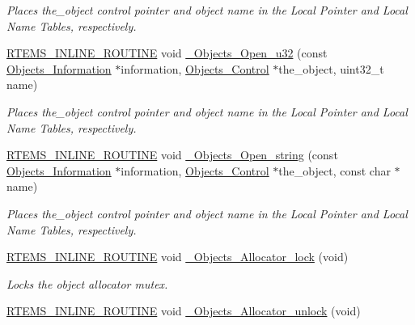 \begin{DoxyCompactItemize}
\begin{DoxyCompactList}\small\item\em Places the\+\_\+object control pointer and object name in the Local Pointer and Local Name Tables, respectively. \end{DoxyCompactList}\item 
\mbox{\hyperlink{group__RTEMSScoreBaseDefs_gac216239df231d5dbd15e3520b0b9313f}{R\+T\+E\+M\+S\+\_\+\+I\+N\+L\+I\+N\+E\+\_\+\+R\+O\+U\+T\+I\+NE}} void \mbox{\hyperlink{group__RTEMSScoreObject_gac0dabb8ef5a83fea690b78aa378c621e}{\+\_\+\+Objects\+\_\+\+Open\+\_\+u32}} (const \mbox{\hyperlink{structObjects__Information}{Objects\+\_\+\+Information}} $\ast$information, \mbox{\hyperlink{structObjects__Control}{Objects\+\_\+\+Control}} $\ast$the\+\_\+object, uint32\+\_\+t name)
\begin{DoxyCompactList}\small\item\em Places the\+\_\+object control pointer and object name in the Local Pointer and Local Name Tables, respectively. \end{DoxyCompactList}\item 
\mbox{\hyperlink{group__RTEMSScoreBaseDefs_gac216239df231d5dbd15e3520b0b9313f}{R\+T\+E\+M\+S\+\_\+\+I\+N\+L\+I\+N\+E\+\_\+\+R\+O\+U\+T\+I\+NE}} void \mbox{\hyperlink{group__RTEMSScoreObject_ga2334557148bfafde009591fc066ab9cc}{\+\_\+\+Objects\+\_\+\+Open\+\_\+string}} (const \mbox{\hyperlink{structObjects__Information}{Objects\+\_\+\+Information}} $\ast$information, \mbox{\hyperlink{structObjects__Control}{Objects\+\_\+\+Control}} $\ast$the\+\_\+object, const char $\ast$name)
\begin{DoxyCompactList}\small\item\em Places the\+\_\+object control pointer and object name in the Local Pointer and Local Name Tables, respectively. \end{DoxyCompactList}\item 
\mbox{\hyperlink{group__RTEMSScoreBaseDefs_gac216239df231d5dbd15e3520b0b9313f}{R\+T\+E\+M\+S\+\_\+\+I\+N\+L\+I\+N\+E\+\_\+\+R\+O\+U\+T\+I\+NE}} void \mbox{\hyperlink{group__RTEMSScoreObject_ga3059733162454cc71ff73288ba9b4dfd}{\+\_\+\+Objects\+\_\+\+Allocator\+\_\+lock}} (void)
\begin{DoxyCompactList}\small\item\em Locks the object allocator mutex. \end{DoxyCompactList}\item 
\mbox{\hyperlink{group__RTEMSScoreBaseDefs_gac216239df231d5dbd15e3520b0b9313f}{R\+T\+E\+M\+S\+\_\+\+I\+N\+L\+I\+N\+E\+\_\+\+R\+O\+U\+T\+I\+NE}} void \mbox{\hyperlink{group__RTEMSScoreObject_ga41a6751fdfbe5adc5f9cb5d12cc8a214}{\+\_\+\+Objects\+\_\+\+Allocator\+\_\+unlock}} (void)

\end{DoxyCompactItemize}

